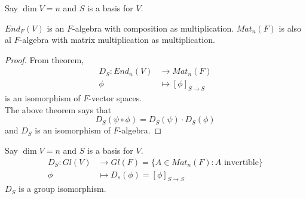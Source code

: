 \begin{remark}
    Say $\dim V = n$ and $S$ is a basis for $V$. 
    
    $End_F(V)$ is an $F$-algebra with composition as multiplication. $Mat_n(F)$ is also al $F$-algebra with matrix multiplication as multiplication. 
\end{remark}
\begin{proof}
    From theorem, 
    \begin{align*}
        D_S : End_n(V) &\to Mat_n(F) \\
         \phi &\mapsto \left[ \phi \right]_{S \to S}
    \end{align*}
    is an isomorphism of $F$-vector spaces.  \\

    The above theorem says that 
    \[
        D_S \left( \psi \circ \phi \right)  = D_S \left( \psi \right)  \cdot D_S \left(  \phi \right) 
    \]
    and $D_S$ is an isomorphism of $F$-algebra. 
\end{proof}
\begin{remark}
    Say $\dim V = n$ and $S$ is a basis for $V$. 
    \begin{align*}
        D_S: Gl(V) &\to Gl(F) = \{ A \in Mat_n(F): A \text{ invertible} \}  \\
        \phi &\mapsto D_s( \phi) = \left[ \phi \right]_{S \to S}
    \end{align*}
    $D_S$ is a group isomorphism.
\end{remark}























\newpage